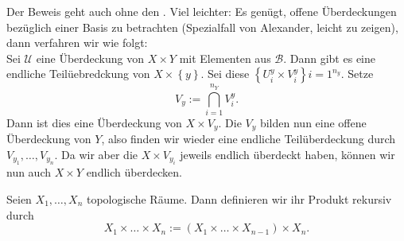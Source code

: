\begin{remark}
    Der Beweis geht auch ohne den . Viel leichter: Es genügt, offene Überdeckungen bezüglich einer Basis zu betrachten (Spezialfall von Alexander, leicht zu zeigen), dann verfahren wir wie folgt: \\
    Sei $\mathcal{U}$ eine Überdeckung von $X\times Y$ mit Elementen aus $\mathcal{B}$. Dann gibt es eine endliche Teilüebredckung von $X\times \left \{y\right\} $. Sei diese $\left \{U_i^y \times V_i^y\right\} i=1^{n_y}$. Setze
    \[
        V_y := \bigcap_{i=1} ^{n_Y} V_i^{y}
    .\] 
    Dann ist dies eine Überdeckung von $X\times V_y$. Die $V_y$ bilden nun eine offene Überdeckung von  $Y$, also finden wir wieder eine endliche Teilüberdeckung durch  $V_{y_1}, \ldots, V_{y_n}$. Da wir aber die $X\times V_{y_i}$ jeweils endlich überdeckt haben, können wir nun auch $X\times Y$ endlich überdecken.
\end{remark}
\begin{ddefinition}\label{def:produkt-endlich-vieler-mengen}
Seien $X_1,\ldots,X_n$ topologische Räume. Dann definieren wir ihr Produkt rekursiv durch
\[
    X_1\times \ldots\times X_n := (X_1\times \ldots\times X_{n-1})\times X_n
.\] 
\end{ddefinition}

